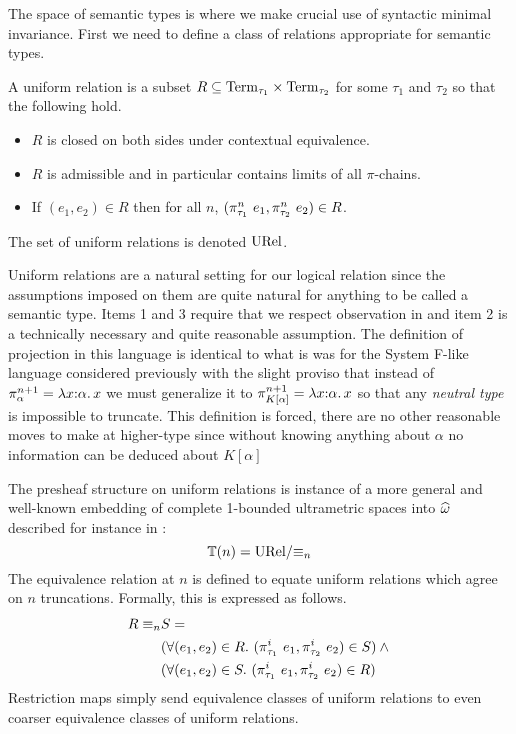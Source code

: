 The space of semantic types is where we make crucial use of syntactic
minimal invariance. First we need to define a class of relations
appropriate for semantic types.
\begin{defn}\label{def:guarded:urel}
  A uniform relation is a subset
  $R \subseteq \mathrm{Term}_{\tau_1} \times \mathrm{Term}_{\tau_2}$ for some $\tau_1$
  and $\tau_2$ so that the following hold.
  \begin{itemize}
  \item $R$ is closed on both sides under contextual equivalence.
  \item $R$ is admissible and in particular contains limits of all
    $\pi$-chains.
  \item If $(e_1, e_2) \in R$ then for all $n$,
    $(\pi_{\tau_1}^n\ e_1, \pi_{\tau_2}^n\ e_2) \in R$.
  \end{itemize}
  The set of uniform relations is denoted $\mathrm{URel}$.
\end{defn}
Uniform relations are a natural setting for our logical relation since
the assumptions imposed on them are quite natural for anything to be
called a semantic type. Items 1 and 3 require that we respect
observation in and item 2 is a technically necessary and quite
reasonable assumption. The definition of projection in this language
is identical to what is was for the System F-like language considered
previously with the slight proviso that instead of
$\pi_{\alpha}^{n + 1} = \lambda x {:} \alpha.\, x$ we must generalize it to
$\pi_{K[\alpha]}^{n + 1} = \lambda x {:} \alpha.\, x$ so that any
\emph{neutral type} is impossible to truncate. This definition is
forced, there are no other reasonable moves to make at higher-type
since without knowing anything about $\alpha$ no information can be
deduced about $K[\alpha]$

The presheaf structure on uniform relations is instance of a more
general and well-known embedding of complete 1-bounded ultrametric
spaces into $\widehat{\omega}$ described for instance in \citet{Birkedal:steps:11}:
\[
  \mathbb{T}(n) = \mathrm{URel} / {\equiv_n}
\]
The equivalence relation at $n$ is defined to equate uniform relations
which agree on $n$ truncations. Formally, this is expressed as
follows.
\begin{align*}
  R \equiv_n &S =\\
  &(\forall (e_1, e_2) \in R.\ (\pi^i_{\tau_1}\ e_1, \pi^i_{\tau_2}\ e_2) \in S) \land {}\\
  &(\forall (e_1, e_2) \in S.\ (\pi^i_{\tau_1}\ e_1, \pi^i_{\tau_2}\ e_2) \in R)
\end{align*}
Restriction maps simply send equivalence classes of uniform relations
to even coarser equivalence classes of uniform relations.

